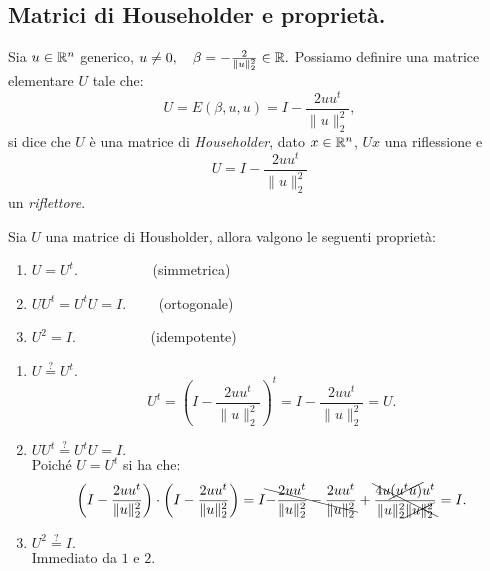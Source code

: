 \subsection{Matrici di Householder e proprietà.}

\begin{defi}
Sia $u \in \mathbb{R}^n$ generico,$ \ u \neq 0, \quad \beta = - \frac{2}{\| u
\|_2^2} \in \mathbb{R}.$
Possiamo definire una matrice elementare $U$ tale che:
\[U = E(\beta, u, u) = I - \frac{2uu^t}{\| u \|_2^2},\]
si dice che $U$ è una matrice di \emph{Householder}, dato $x \in \mathbb{R}^n$, $Ux$
una riflessione e
\[U = I - \frac{2uu^t}{\| u \|_2^2}\]
un \emph{riflettore}.
\end{defi}

\begin{prop}
Sia $U$ una matrice di Housholder, allora valgono le seguenti proprietà:
\begin{enumerate}
\item $U = U^t. \quad\qquad\qquad$ (simmetrica)
\item $UU^t = U^tU = I. \qquad$ (ortogonale)
\item $U^2 = I. \quad\qquad\qquad$ (idempotente)
\end{enumerate}
\end{prop}
\begin{dimo}
\begin{enumerate}
\item $U \stackrel{?}{=} U^t.$
\[U^t = \left(I - \frac{2uu^t}{\| u \|_2^2}\right)^t
= I - \frac{2uu^t}{\| u \|_2^2} = U.\]
\item $UU^t \stackrel{?}{=} U^tU = I.$\\
Poiché $U = U^t$ si ha che:
\[
\left(I - \frac{2uu^t}{\| u \|_2^2}\right)\cdot
\left(I - \frac{2uu^t}{\| u \|_2^2}\right) =
I \bcancel{- \frac{2uu^t}{\| u \|_2^2}
  - \frac{2uu^t}{\| u \|_2^2}}
+ \bcancel{\frac{4u\cancel{(u^tu)}u^t}{\| u \|_2^2
\cancel{\| u \|_2^2}}} = I.
\]
\item $U^2 \stackrel{?}{=} I.$\\
Immediato da $1$ e $2$.
\end{enumerate}
\end{dimo}

